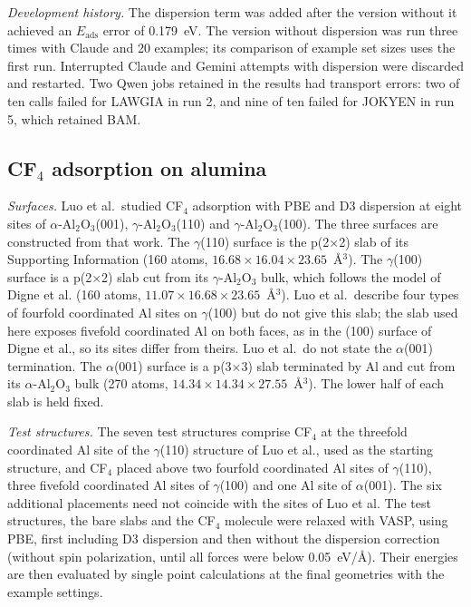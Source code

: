 \textit{Development history.} The dispersion term was added after the version without it achieved an $E_\mathrm{ads}$ error of 0.179~eV. The version without dispersion was run three times with Claude and 20 examples; its comparison of example set sizes uses the first run. Interrupted Claude and Gemini attempts with dispersion were discarded and restarted. Two Qwen jobs retained in the results had transport errors: two of ten calls failed for LAWGIA in run 2, and nine of ten failed for JOKYEN in run 5, which retained BAM.

\subsection{CF$_4$ adsorption on alumina}
\label{si:app-cf4}

\textit{Surfaces.} Luo et al.\ studied CF$_4$ adsorption with PBE and D3 dispersion at eight sites of $\alpha$-Al$_2$O$_3$(001), $\gamma$-Al$_2$O$_3$(110) and $\gamma$-Al$_2$O$_3$(100).\cite{luo2024cf4} The three surfaces are constructed from that work. The $\gamma$(110) surface is the p(2$\times$2) slab of its Supporting Information (160 atoms, $16.68\times16.04\times23.65$~\AA$^3$). The $\gamma$(100) surface is a p(2$\times$2) slab cut from its $\gamma$-Al$_2$O$_3$ bulk, which follows the model of Digne et al.\cite{digne2002alumina,digne2004alumina} (160 atoms, $11.07\times16.68\times23.65$~\AA$^3$). Luo et al.\ describe four types of fourfold coordinated Al sites on $\gamma$(100) but do not give this slab; the slab used here exposes fivefold coordinated Al on both faces, as in the (100) surface of Digne et al., so its sites differ from theirs. Luo et al.\ do not state the $\alpha$(001) termination. The $\alpha$(001) surface is a p(3$\times$3) slab terminated by Al and cut from its $\alpha$-Al$_2$O$_3$ bulk (270 atoms, $14.34\times14.34\times27.55$~\AA$^3$). The lower half of each slab is held fixed.

\textit{Test structures.} The seven test structures comprise CF$_4$ at the threefold coordinated Al site of the $\gamma$(110) structure of Luo et al., used as the starting structure, and CF$_4$ placed above two fourfold coordinated Al sites of $\gamma$(110), three fivefold coordinated Al sites of $\gamma$(100) and one Al site of $\alpha$(001). The six additional placements need not coincide with the sites of Luo et al. The test structures, the bare slabs and the CF$_4$ molecule were relaxed with VASP, using PBE, first including D3 dispersion and then without the dispersion correction (without spin polarization, until all forces were below 0.05~eV/\AA). Their energies are then evaluated by single point calculations at the final geometries with the example settings.

